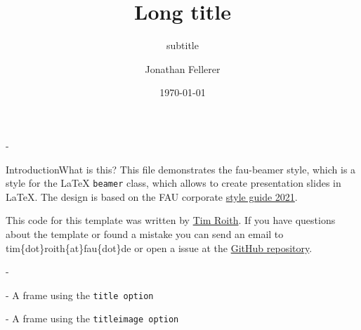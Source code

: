 \documentclass[final]{beamer}
\title[Short title]{Long title}
\subtitle{subtitle}
\author[J. Fellerer]{
  Jonathan Fellerer%
}
\institute[FAU]{%
  Friedrich-Alexander-Universität Erlangen-Nürnberg, Computer Science 7%
}
\date{\today}
\begin{document}
\begin{frame}[t,titleimagenofooter]{-}
  \titlepage%
\end{frame}

\begin{frame}[t]{Introduction}{What is this?}
  This file demonstrates the fau-beamer style, which is a style for
  the \LaTeX{} \texttt{beamer} class, which allows to create
  presentation slides in \LaTeX. The design is based on the FAU
  corporate
  \href{https://www.intern.fau.de/kommunikation-marketing-und-corporate-identity/corporate-identity/}{
  style guide 2021}.

  This code for this template was written by
  \href{https://timroith.github.io/}{Tim Roith}. If you have
  questions about the template or found a mistake you can send an
  email to tim\{dot\}roith\{at\}fau\{dot\}de or open a issue at the
  \href{https://github.com/FAU-AMMN/fau-beamer}{GitHub repository}.
\end{frame}

%
\begin{frame}[title]{-}
  \tableofcontents
\end{frame}

\begin{frame}[t,title]{-}
  A frame using the \texttt{title option}
\end{frame}

\begin{frame}[t,titleimage]{-}
  A frame using the \texttt{titleimage option}
\end{frame}

%
%
%

\end{document}
